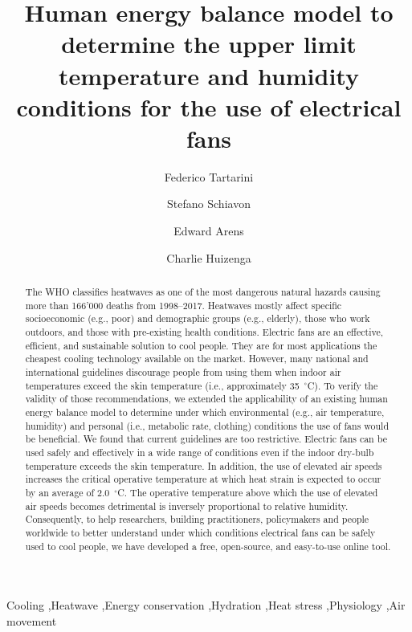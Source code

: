 
\begin{frontmatter}

\title{Human energy balance model to determine the upper limit temperature and humidity conditions for the use of electrical fans}

\author[sinBerBest]{Federico Tartarini}
\author[CBE]{Stefano Schiavon}
\author[CBE]{Edward Arens}
\author[CBE]{Charlie Huizenga}

\address[sinBerBest]{SinBerBEST, Berkeley Education Alliance for Research in Singapore, Singapore}
\address[CBE]{Center for the Built Environment, University of California, Berkeley, USA}

\begin{abstract}
    The WHO classifies heatwaves as one of the most dangerous natural hazards causing more than 166'000 deaths from 1998--2017.
    Heatwaves mostly affect specific socioeconomic (e.g., poor) and demographic groups (e.g., elderly), those who work outdoors, and those with pre-existing health conditions.
    Electric fans are an effective, efficient, and sustainable solution to cool people.
    They are for most applications the cheapest cooling technology available on the market.
    However, many national and international guidelines discourage people from using them when indoor air temperatures exceed the skin temperature (i.e., approximately 35~$^{\circ}$C\@).
    To verify the validity of those recommendations, we extended the applicability of an existing human energy balance model to determine under which environmental (e.g., air temperature, humidity) and personal (i.e., metabolic rate, clothing) conditions the use of fans would be beneficial.
    We found that current guidelines are too restrictive.
    Electric fans can be used safely and effectively in a wide range of conditions even if the indoor dry-bulb temperature exceeds the skin temperature.
    In addition, the use of elevated air speeds increases the critical operative temperature at which heat strain is expected to occur by an average of 2.0~$^{\circ}$C\@.
    The operative temperature above which the use of elevated air speeds becomes detrimental is inversely proportional to relative humidity.
    Consequently, to help researchers, building practitioners, policymakers and people worldwide to better understand under which conditions electrical fans can be safely used to cool people, we have developed a free, open-source, and easy-to-use online tool.
\end{abstract}

\begin{keyword}
Cooling \sep Heatwave \sep Energy conservation \sep Hydration \sep Heat stress \sep Physiology \sep Air movement
\end{keyword}

\end{frontmatter}
